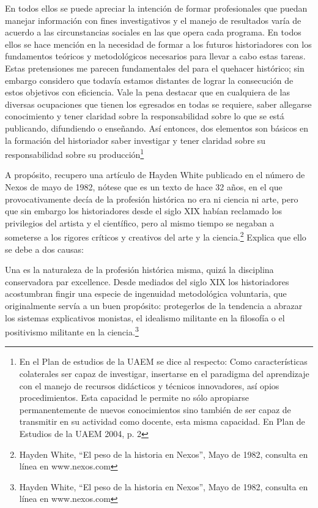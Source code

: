 En todos ellos se puede apreciar la intención de formar profesionales 
que puedan manejar información con fines investigativos y el manejo de 
resultados varía de acuerdo a las circunstancias sociales en las que 
opera cada programa. En todos ellos se hace mención en la necesidad de 
formar a los futuros historiadores con los fundamentos teóricos y 
metodológicos necesarios para llevar a cabo estas tareas. Estas 
pretensiones me parecen fundamentales del para el quehacer histórico; 
sin embargo considero que todavía estamos distantes de lograr la 
consecución de estos objetivos con eficiencia. Vale la pena destacar 
que en cualquiera de las diversas ocupaciones que tienen los egresados 
en todas se requiere, saber allegarse conocimiento y tener claridad 
sobre la responsabilidad sobre lo que se está publicando, difundiendo o 
enseñando. Así entonces, dos elementos son básicos en la formación del 
historiador saber investigar y tener claridad sobre su responsabilidad 
sobre su producción\footnote{ En el Plan de estudios de la UAEM se dice 
al respecto: Como características colaterales ser capaz de investigar, 
insertarse en el paradigma del aprendizaje con el manejo de recursos 
didácticos y técnicos innovadores, así opios procedimientos. Esta 
capacidad le permite no sólo apropiarse permanentemente de nuevos 
conocimientos sino también de ser capaz de transmitir en su actividad 
como docente, esta misma capacidad. En Plan de Estudios de la UAEM 
2004, p. 2}

A propósito, recupero una artículo de Hayden White publicado en el 
número de Nexos de mayo de 1982, nótese que es un texto de hace 32 
años, en el que provocativamente decía de la profesión histórica no era 
ni ciencia ni arte, pero que sin embargo los historiadores desde el 
siglo XIX habían reclamado los privilegios del artista y el científico, 
pero al mismo tiempo se negaban a someterse a los rigores críticos y 
creativos del arte y la ciencia.\footnote{ Hayden White, “El peso de la 
historia en Nexos”, Mayo de 1982, consulta en línea en www.nexos.com} 
Explica que ello se debe a dos causas: 

Una es la naturaleza de la profesión histórica misma, quizá la 
disciplina conservadora  par excellence. Desde mediados del siglo XIX 
los historiadores acostumbran fingir una especie de ingenuidad 
metodológica voluntaria, que originalmente servía a un buen propósito: 
protegerlos de la tendencia a abrazar los sistemas explicativos 
monistas, el idealismo militante en la filosofía o el positivismo 
militante en la ciencia.\footnote{ Hayden White, “El peso de la 
historia en Nexos”, Mayo de 1982, consulta en línea en www.nexos.com}

